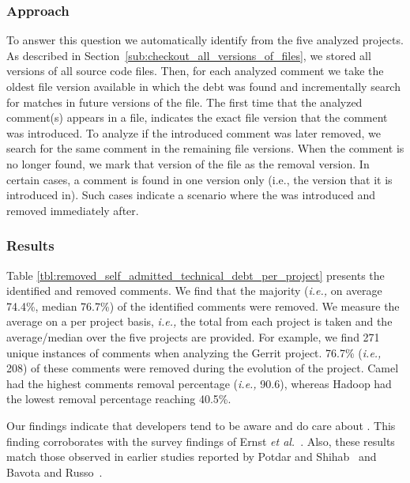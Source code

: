 \subsubsection*{Approach} To answer this question we automatically identify \SATD from the five analyzed projects. As described in Section~\ref{sub:checkout_all_versions_of_files}, we stored all versions of all source code files. Then, for each analyzed \SATD comment we take the oldest file version available in which the debt was found and incrementally search for matches in future versions of the file. The first time that the analyzed \SATD comment(s) appears in a file, indicates the exact file version that the \SATD comment was introduced. To analyze if the introduced \SATD comment was later removed, we search for the same comment in the remaining file versions. When the comment is no longer found, we mark that version of the file as the removal version. In certain cases, a \SATD comment is found in one version only (i.e., the version that it is introduced in). Such cases indicate a scenario where the \SATD was introduced and removed immediately after. 



\subsubsection*{Results} Table \ref{tbl:removed_self_admitted_technical_debt_per_project} presents the identified and removed \SATD comments. We find that the majority (\textit{i.e.,} on average 74.4\%, median 76.7\%) of the identified \SATD comments were removed. We measure the average on a per project basis, \textit{i.e.,} the total from each project is taken and the average/median over the five projects are provided. For example, we find 271 unique instances of \SATD comments when analyzing the Gerrit project. 76.7\% (\textit{i.e.,} 208) of these \SATD comments were removed during the evolution of the project. Camel had the highest \SATD comments removal percentage (\textit{i.e.,} 90.6), whereas Hadoop had the lowest removal percentage reaching 40.5\%. 

Our findings indicate that developers tend to be aware and do care about \SATD. This finding corroborates with the survey findings of Ernst \emph{et al.}~\cite{Ernst2015FSE}. Also, these results match those observed in earlier studies reported by Potdar and Shihab~\cite{Potdar2014ICSME} and Bavota and Russo~\cite{Bavota2016MSR}.






